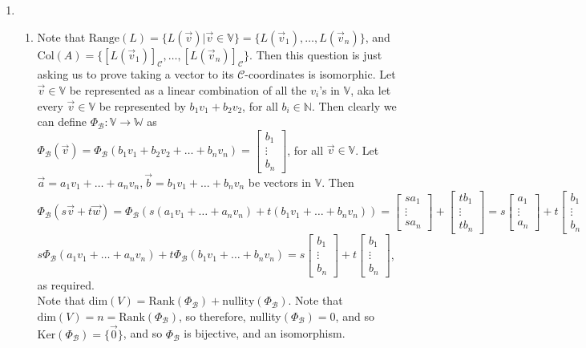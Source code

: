 \documentclass[10pt,english]{article}
\begin{document}
\begin{enumerate}
\pagebreak
\item \begin{enumerate}
    \item Note that $\text{Range}(L)=\{L(\vec{v})|\vec{v}\in\mathbb{V}\}=\{L(\vec{v}_1),\ldots,L(\vec{v}_n)\}$, and $\text{Col}(A)=\{[L(\vec{v}_1)]_\mathcal{C},\ldots,[L(\vec{v}_n)]_\mathcal{C}\}$. Then this question is just asking us to prove taking a vector to its $\mathcal{C}$-coordinates is isomorphic. Let $\vec{v}\in\mathbb{V}$ be represented as a linear combination of all the $v_i$'s in $\mathbb{V}$, aka let every $\vec{v}\in\mathbb{V}$ be represented by $b_1v_1+b_2v_2$, for all $b_i\in\mathbb{N}$. Then clearly we can define $\Phi_\mathcal{B}:\mathbb{V}\rightarrow \mathbb{W}$ as $\Phi_{\mathcal{B}}(\vec{v})=\Phi_{\mathcal{B}}(b_1v_1+b_2v_2+\ldots+b_nv_n)=\begin{bmatrix}b_1\\\vdots\\b_n\end{bmatrix}$, for all $\vec{v}\in \mathbb{V}$. Let $\vec{a}=a_1v_1+\ldots+a_nv_n,\vec{b}=b_1v_1+\ldots+b_nv_n$ be vectors in $\mathbb{V}$. Then $\Phi_{\mathcal{B}}(s\vec{v}+t\vec{w})=\Phi_{\mathcal{B}}(s(a_1v_1+\ldots+a_nv_n)+t(b_1v_1+\ldots+b_nv_n))=\begin{bmatrix}sa_1\\\vdots\\sa_n\end{bmatrix}+\begin{bmatrix}tb_1\\\vdots\\tb_n\end{bmatrix}=s\begin{bmatrix}a_1\\\vdots\\a_n\end{bmatrix}+t\begin{bmatrix}b_1\\\vdots\\b_n\end{bmatrix}$ \\ 
$s\Phi_\mathcal{B}(a_1v_1+\ldots+a_nv_n)+t\Phi_\mathcal{B}(b_1v_1+\ldots+b_nv_n)=s\begin{bmatrix}b_1\\\vdots\\b_n\end{bmatrix}+t\begin{bmatrix}b_1\\\vdots\\b_n\end{bmatrix}$, as required. \\ 
Note that dim$(V)=\text{Rank}(\Phi_\mathcal{B})+\text{nullity}(\Phi_\mathcal{B})$. Note that $\text{dim}(V)=n=\text{Rank}(\Phi_\mathcal{B})$, so therefore, nullity$(\Phi_\mathcal{B})=0$, and so $\text{Ker}(\Phi_\mathcal{B})=\{\vec{0}\}$, and so $\Phi_\mathcal{B}$ is bijective, and an isomorphism. 
    

\end{enumerate}
\end{enumerate}
\end{document}
